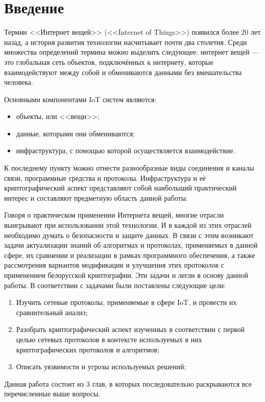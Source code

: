 \chapter*{Введение}
 
 	Термин <<Интернет вещей>> (<<Internet of Things>>) появился более 20 лет назад, а история развития
 	технологии насчитывает почти два столетия. Среди множества определений термина можно выделить
 	следующее: интернет вещей --- это глобальная сеть объектов, подключённых к интернету, которые 
 	взаимодействуют между собой и обмениваются данными без вмешательства человека.
 	
 	Основными компонентами IoT систем являются:
 	\begin{itemize}
 		\item объекты, или <<вещи>>;
 		\item данные, которыми они обмениваются;
 		\item инфраструктура, с помощью которой осуществляется взаимодействие.
 	\end{itemize}
 
 	К последнему пункту можно отнести разнообразные виды соединения и каналы связи, программные 
 	средства и протоколы. Инфраструктура и её криптографический аспект представляют собой наибольший
 	практический интерес и составляют предметную область данной работы.
 	
 	Говоря о практическом применении Интернета вещей, многие отрасли выигрывают при использовании
 	этой технологии. И в каждой из этих отраслей необходимо думать о безопасности и защите данных.
 	В связи с этим возникают задачи актуализации знаний об алгоритмах и протоколах, применяемых в
 	данной сфере, их сравнении и реализации в рамках программного обеспечения, а также рассмотрения
 	вариантов модификации и улучшения этих протоколов с применением белорусской криптографии. Эти
 	задачи и легли в основу данной работы. В соответствии с задачами были поставлены следующие цели:
 	
 	\begin{enumerate}
 		\item Изучить сетевые протоколы, применяемые в сфере IoT, и провести их сравнительный анализ;
 		\item Разобрать криптографический аспект изученных в соответствии с первой целью сетевых 
 		протоколов в контексте используемых в них криптографических протоколов и алгоритмов;
 		\item Описать уязвимости и угрозы используемых решений;
 	\end{enumerate}
 	
 	Данная работа состоит из 3 глав, в которых последовательно раскрываются все перечисленные выше
 	вопросы.